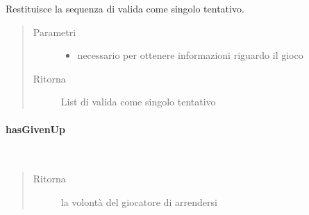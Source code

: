 \documentclass[letterpaper,10pt,italian]{sphinxmanual}
\begin{document}
\begin{fulllineitems}
\label{\detokenize{source/it/unicam/cs/pa/mastermind/players/CodeBreaker:it.unicam.cs.pa.mastermind.players.CodeBreaker.getAttempt(InteractionView)}}
Restituisce la sequenza di  valida come singolo tentativo.
\begin{quote}\begin{description}
\item[{Parametri}] \leavevmode\begin{itemize}
\item {} 
 \textendash{} necessario per ottenere informazioni riguardo il gioco

\end{itemize}

\item[{Ritorna}] \leavevmode
List di  valida come singolo tentativo

\end{description}\end{quote}

\end{fulllineitems}



\paragraph{hasGivenUp}
\label{\detokenize{source/it/unicam/cs/pa/mastermind/players/CodeBreaker:hasgivenup}}

\begin{fulllineitems}
\label{\detokenize{source/it/unicam/cs/pa/mastermind/players/CodeBreaker:it.unicam.cs.pa.mastermind.players.CodeBreaker.hasGivenUp()}}~\begin{quote}\begin{description}
\item[{Ritorna}] \leavevmode
la volontà del giocatore  di arrendersi

\end{description}\end{quote}

\end{fulllineitems}
\end{document}
